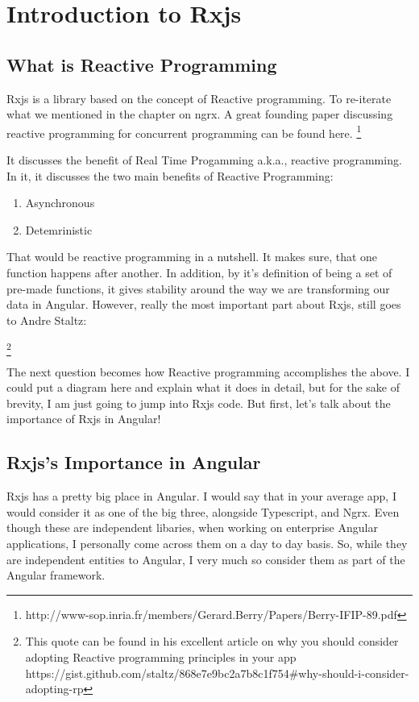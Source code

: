 \chapter{ Introduction to Rxjs }

\section{ What is Reactive Programming}

Rxjs is a library based on the concept of Reactive programming. To re-iterate 
what we mentioned in the chapter on ngrx. A great founding paper discussing 
reactive programming for concurrent programming can be found here. 
\footnote{http://www-sop.inria.fr/members/Gerard.Berry/Papers/Berry-IFIP-89.pdf}

It discusses the benefit of Real Time Progamming a.k.a., reactive programming.
In it, it discusses the two main benefits of Reactive Programming:
\begin{enumerate}
  \item Asynchronous
  \item Detemrinistic
\end{enumerate}

That would be reactive programming in a nutshell. It makes sure, that one 
function happens after another. In addition, by it's definition of being 
a set of pre-made functions, it gives stability around the way we are 
transforming our data in Angular. However, really the most important part 
about Rxjs, still goes to Andre Staltz: 

\begin{quote}
\end{quote} 
\footnote{This quote can be found in his excellent article on why you should 
consider adopting Reactive programming principles in your app 
https://gist.github.com/staltz/868e7e9bc2a7b8c1f754\#why-should-i-consider-adopting-rp}

The next question becomes how Reactive programming accomplishes the above. I 
could put a diagram here and explain what it does in detail, but for the sake 
of brevity, I am just going to jump into Rxjs code. But first, let's talk 
about the importance of Rxjs in Angular!

\section{ Rxjs's Importance in Angular }
Rxjs has a pretty big place in Angular. I would say that in your average app, 
I would consider it as one of the big three, alongside Typescript, and Ngrx. 
Even though these are independent libaries, when working on enterprise Angular
applications, I personally come across them on a day to day basis. So, while 
they are independent entities to Angular, I very much so consider them as part 
of the Angular framework. 

